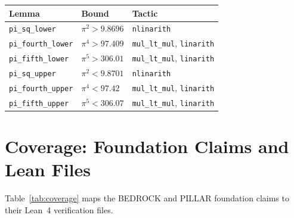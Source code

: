 \documentclass[11pt,a4paper]{article}
\begin{document}
\begin{center}
\begin{tabular}{lll}
\toprule
Lemma & Bound & Tactic \\
\midrule
\texttt{pi\_sq\_lower}     & $\pi^2 > 9.8696$ & \texttt{nlinarith} \\
\texttt{pi\_fourth\_lower} & $\pi^4 > 97.409$ & \texttt{mul\_lt\_mul}, \texttt{linarith} \\
\texttt{pi\_fifth\_lower}  & $\pi^5 > 306.01$ & \texttt{mul\_lt\_mul}, \texttt{linarith} \\
\texttt{pi\_sq\_upper}     & $\pi^2 < 9.8701$ & \texttt{nlinarith} \\
\texttt{pi\_fourth\_upper} & $\pi^4 < 97.42$  & \texttt{mul\_lt\_mul}, \texttt{linarith} \\
\texttt{pi\_fifth\_upper}  & $\pi^5 < 306.07$ & \texttt{mul\_lt\_mul}, \texttt{linarith} \\
\bottomrule
\end{tabular}
\end{center}

\section{Coverage: Foundation Claims and Lean Files}
\label{sec:coverage}

Table~\ref{tab:coverage} maps the BEDROCK and PILLAR foundation claims
to their Lean~4 verification files.
\end{document}
